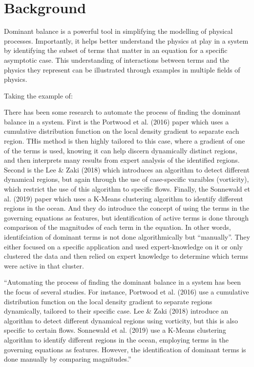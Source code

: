 \documentclass[12pt]{report} %
\begin{document}
\chapter{Background}



Dominant balance is a powerful tool in simplifying the modelling of physical processes. Importantly, it helps better understand the physics at play in a system by identifying the subset of terms that matter in an equation for a specific asymptotic case. This understanding of interactions between terms and the physics they represent can be illustrated through examples in multiple fields of physics.

Taking the example of:



There has been some research to automate the process of finding the dominant balance in a system. First is the Portwood et al. (2016)\cite{portwood2016robust} paper which uses a cumulative distribution function on the local density gradient to separate each region. THis method is then highly tailored to this case, where a gradient of one of the terms is used, knowing it can help discern dynamically distinct regions, and then interprets many results from expert analysis of the identified regions. Second is the Lee \& Zaki (2018)\cite{lee2018detection} which introduces an algorithm to detect different dynamical regions, but again through the use of case-specific varaibles (vorticity), which restrict the use of this algorithm to specific flows. Finally, the Sonnewald et al. (2019)\cite{sonnewald2019unsupervised} paper which uses a K-Means clustering algorithm to identify different regions in the ocean. And they do introduce the concept of using the terms in the governing equations as features, but identification of active terms is done through comparison of the magnitudes of each term in the equation. In other words, identifciation of dominant terms is not done algorithmically but ``manually''.
They either focused on a specific application and used expert-knowledge on it or only clustered the data and then relied on expert knowledge to determine which terms were active in that cluster.

``Automating the process of finding the dominant balance in a system has been the focus of several studies. For instance, Portwood et al. (2016) use a cumulative distribution function on the local density gradient to separate regions dynamically, tailored to their specific case. Lee \& Zaki (2018) introduce an algorithm to detect different dynamical regions using vorticity, but this is also specific to certain flows. Sonnewald et al. (2019) use a K-Means clustering algorithm to identify different regions in the ocean, employing terms in the governing equations as features. However, the identification of dominant terms is done manually by comparing magnitudes.''
\end{document}
